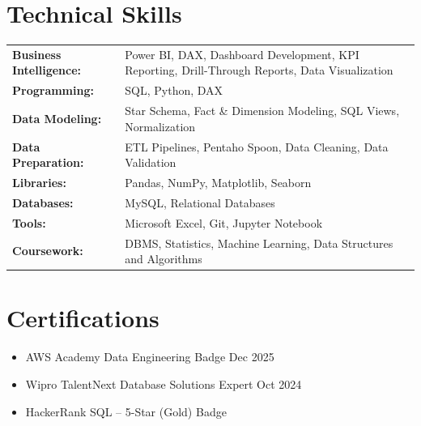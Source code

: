 \documentclass[a4paper,12pt]{article}
\begin{document}
\section{Technical Skills}
\begin{tabularx}{\linewidth}{@{}l X@{}}
\textbf{Business Intelligence:} & \normalsize{Power BI, DAX, Dashboard Development, KPI Reporting, Drill-Through Reports, Data Visualization}\\
\textbf{Programming:} & \normalsize{SQL, Python, DAX}\\
\textbf{Data Modeling:} & \normalsize{Star Schema, Fact \& Dimension Modeling, SQL Views, Normalization}\\
\textbf{Data Preparation:} & \normalsize{ETL Pipelines, Pentaho Spoon, Data Cleaning, Data Validation}\\
\textbf{Libraries:} & \normalsize{Pandas, NumPy, Matplotlib, Seaborn}\\
\textbf{Databases:} & \normalsize{MySQL, Relational Databases}\\
\textbf{Tools:} & \normalsize{Microsoft Excel, Git, Jupyter Notebook}\\
\textbf{Coursework:} & \normalsize{DBMS, Statistics, Machine Learning, Data Structures and Algorithms}\\

\end{tabularx}


\section{Certifications}

\begin{itemize}[leftmargin=1em, itemsep=10pt, label=--]
    \item AWS Academy Data Engineering Badge \hfill Dec 2025
    \item Wipro TalentNext Database Solutions Expert \hfill Oct 2024
    \item HackerRank SQL -- 5-Star (Gold) Badge
\end{itemize}


\vfill
\center
\end{document}
